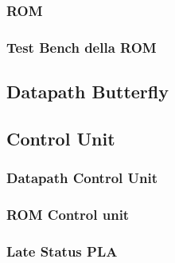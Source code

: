 

\subsubsection{ROM}



\subsubsection{Test Bench della ROM}



\subsection{Datapath Butterfly}



\subsection{Control Unit}

\subsubsection{Datapath Control Unit}
\label{listing: control_unit_datapath}



\subsubsection{ROM Control unit}



\subsubsection{Late Status PLA}



